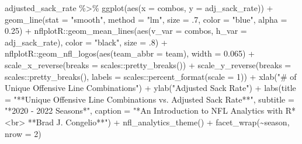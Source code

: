 \documentclass[
  letterpaper,
]{krantz}
\newenvironment{Shaded}{\begin{snugshade}}{\end{snugshade}}
\newcommand{\AttributeTok}[1]{\textcolor[rgb]{0.40,0.45,0.13}{#1}}
\newcommand{\DecValTok}[1]{\textcolor[rgb]{0.68,0.00,0.00}{#1}}
\newcommand{\FloatTok}[1]{\textcolor[rgb]{0.68,0.00,0.00}{#1}}
\newcommand{\FunctionTok}[1]{\textcolor[rgb]{0.28,0.35,0.67}{#1}}
\newcommand{\NormalTok}[1]{\textcolor[rgb]{0.00,0.23,0.31}{#1}}
\newcommand{\SpecialCharTok}[1]{\textcolor[rgb]{0.37,0.37,0.37}{#1}}
\newcommand{\StringTok}[1]{\textcolor[rgb]{0.13,0.47,0.30}{#1}}
\begin{document}
\begin{Shaded}
\begin{Highlighting}[]
\NormalTok{adjusted\_sack\_rate }\SpecialCharTok{\%\textgreater{}\%}
  \FunctionTok{ggplot}\NormalTok{(}\FunctionTok{aes}\NormalTok{(}\AttributeTok{x =}\NormalTok{ combos, }\AttributeTok{y =}\NormalTok{ adj\_sack\_rate)) }\SpecialCharTok{+}
  \FunctionTok{geom\_line}\NormalTok{(}\AttributeTok{stat =} \StringTok{"smooth"}\NormalTok{, }\AttributeTok{method =} \StringTok{"lm"}\NormalTok{,}
            \AttributeTok{size =}\NormalTok{ .}\DecValTok{7}\NormalTok{,}
            \AttributeTok{color =} \StringTok{"blue"}\NormalTok{,}
            \AttributeTok{alpha =} \FloatTok{0.25}\NormalTok{) }\SpecialCharTok{+}
\NormalTok{  nflplotR}\SpecialCharTok{::}\FunctionTok{geom\_mean\_lines}\NormalTok{(}\FunctionTok{aes}\NormalTok{(}\AttributeTok{v\_var =}\NormalTok{ combos, }\AttributeTok{h\_var =}\NormalTok{ adj\_sack\_rate),}
                            \AttributeTok{color =} \StringTok{"black"}\NormalTok{, }\AttributeTok{size =}\NormalTok{ .}\DecValTok{8}\NormalTok{) }\SpecialCharTok{+}
\NormalTok{  nflplotR}\SpecialCharTok{::}\FunctionTok{geom\_nfl\_logos}\NormalTok{(}\FunctionTok{aes}\NormalTok{(}\AttributeTok{team\_abbr =}\NormalTok{ team), }\AttributeTok{width =} \FloatTok{0.065}\NormalTok{) }\SpecialCharTok{+}
  \FunctionTok{scale\_x\_reverse}\NormalTok{(}\AttributeTok{breaks =}\NormalTok{ scales}\SpecialCharTok{::}\FunctionTok{pretty\_breaks}\NormalTok{()) }\SpecialCharTok{+}
  \FunctionTok{scale\_y\_reverse}\NormalTok{(}\AttributeTok{breaks =}\NormalTok{ scales}\SpecialCharTok{::}\FunctionTok{pretty\_breaks}\NormalTok{(),}
                  \AttributeTok{labels =}\NormalTok{ scales}\SpecialCharTok{::}\FunctionTok{percent\_format}\NormalTok{(}\AttributeTok{scale =} \DecValTok{1}\NormalTok{)) }\SpecialCharTok{+}
  \FunctionTok{xlab}\NormalTok{(}\StringTok{"\# of Unique Offensive Line Combinations"}\NormalTok{) }\SpecialCharTok{+}
  \FunctionTok{ylab}\NormalTok{(}\StringTok{"Adjusted Sack Rate"}\NormalTok{) }\SpecialCharTok{+}
  \FunctionTok{labs}\NormalTok{(}\AttributeTok{title =} \StringTok{"**Unique Offensive Line Combinations vs.}
\StringTok{       Adjusted Sack Rate**"}\NormalTok{,}
       \AttributeTok{subtitle =} \StringTok{"*2020 {-} 2022 Seasons*"}\NormalTok{,}
       \AttributeTok{caption =} \StringTok{"*An Introduction to NFL Analytics with R*\textless{}br\textgreater{}}
\StringTok{       **Brad J. Congelio**"}\NormalTok{) }\SpecialCharTok{+}
  \FunctionTok{nfl\_analytics\_theme}\NormalTok{() }\SpecialCharTok{+}
  \FunctionTok{facet\_wrap}\NormalTok{(}\SpecialCharTok{\textasciitilde{}}\NormalTok{season, }\AttributeTok{nrow =} \DecValTok{2}\NormalTok{)}
\end{Highlighting}
\end{Shaded}
\end{document}
